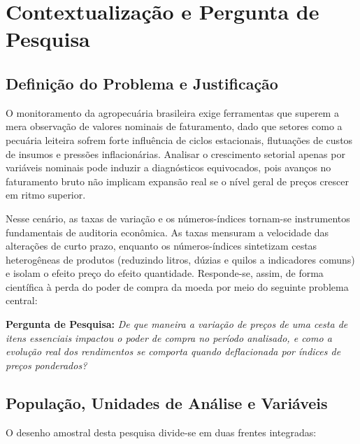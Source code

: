 \documentclass[12pt,a4paper]{article}
\begin{document}
\newpage
\tableofcontents
\newpage


\section{Contextualização e Pergunta de Pesquisa}
\label{sec:contexto}
\subsection{Definição do Problema e Justificação}
O monitoramento da agropecuária brasileira exige ferramentas que superem a mera observação de valores nominais de faturamento, dado que setores como a pecuária leiteira sofrem forte influência de ciclos estacionais, flutuações de custos de insumos e pressões inflacionárias. Analisar o crescimento setorial apenas por variáveis nominais pode induzir a diagnósticos equivocados, pois avanços no faturamento bruto não implicam expansão real se o nível geral de preços crescer em ritmo superior.

Nesse cenário, as taxas de variação e os números-índices tornam-se instrumentos fundamentais de auditoria econômica. As taxas mensuram a velocidade das alterações de curto prazo, enquanto os números-índices sintetizam cestas heterogêneas de produtos (reduzindo litros, dúzias e quilos a indicadores comuns) e isolam o efeito preço do efeito quantidade. Responde-se, assim, de forma científica à perda do poder de compra da moeda por meio do seguinte problema central:

\noindent\textbf{Pergunta de Pesquisa:} \textit{De que maneira a variação de preços de uma cesta de itens essenciais impactou o poder de compra no período analisado, e como a evolução real dos rendimentos se comporta quando deflacionada por índices de preços ponderados?}

\subsection{População, Unidades de Análise e Variáveis}
O desenho amostral desta pesquisa divide-se em duas frentes integradas:
\end{document}
